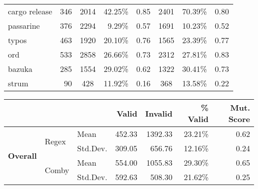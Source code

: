 \documentclass[acmsmall,screen,review,anonymous]{acmart}
\newcommand{\mr}[2]{\multirow{#1}{*}{#2}}
\begin{document}
{\begin{table}[hbtp]
\begin{varwidth}{.8\linewidth}
\begin{tabularx}{\linewidth}{X|r|crr|crr}
cargo release    & 346          & 2014   & 42.25\%  & 0.85
& 2401   & 70.39\% & 0.80\\
passarine        & 376          & 2294   & 9.29\%  & 0.57
 & 1691   & 10.23\% & 0.52\\
typos            & 463          & 1920   & 20.10\% & 0.76  & 1565   & 23.39\% & 0.77\\
ord              & 533          & 2858   & 26.66\%  & 0.73
& 2312   & 27.81\% & 0.83\\
bazuka           & 285          & 1554   & 29.02\% & 0.62 & 1322   & 30.41\% & 0.73\\
strum            & 90           & 428     & 11.92\% & 0.16 & 368    & 13.58\% & 0.22\\\bottomrule
\end{tabularx}
\begin{tabularx}{\linewidth}{Xllrrrr}
               & & & \textbf{Valid}  & \textbf{Invalid}  & \textbf{\% Valid} & \textbf{Mut. Score} \\\midrule
 \multirow{4}{*}{\textbf{Overall}} & \mr{2}{Regex} & Mean     &  452.33 &  1392.33 & 23.21\% & 0.62\\
               &   & Std.Dev. & 309.05 & 656.76 & 12.16\%  & 0.24\\\cline{2-7}
 & \mr{2}{Comby} & Mean     & 554.00 &  1055.83 & 29.30\% & 0.65\\
               &   & Std.Dev. & 592.63 & 508.30 & 21.62\%  & 0.25\\\bottomrule
\end{tabularx}
\end{varwidth}
\end{table}


}
\end{document}
